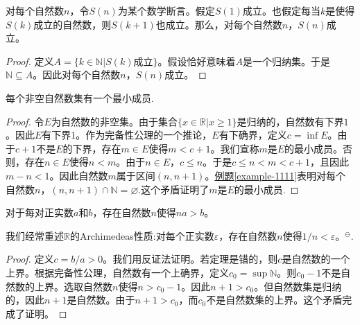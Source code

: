 \documentclass[lang=cn,newtx,10pt,scheme=chinese]{../Template/elegantbook}
\begin{document}
\begin{theorem}[数学归纳法原理]\label{theorem:数学归纳法原理}
  对每个自然数\(n\)，令\(S(n)\)为某个数学断言。假定\(S(1)\)成立。也假定每当\(k\)是使得\(S(k)\)成立的自然数，则\(S(k + 1)\)也成立。那么，对每个自然数\(n\)，\(S(n)\)成立。
\end{theorem}
\begin{proof}
  定义\(A = \{k\in\mathbb{N}|S(k)\)成立\(\}\)。假设恰好意味着\(A\)是一个归纳集。于是\(\mathbb{N}\subseteq A\)。因此对每个自然数\(n\)，\(S(n)\)成立。

\end{proof}

\begin{theorem}\label{theorem:每个非空自然数集有一个最小成员.}
  每个非空自然数集有一个最小成员.
\end{theorem}
\begin{proof}
  令\(E\)为自然数的非空集。由于集合\(\{x\in\mathbb{R}|x\geqslant1\}\)是归纳的，自然数有下界\(1\)。因此\(E\)有下界\(1\)。作为完备性公理的一个推论，\(E\)有下确界，定义\(c=\inf E\)。由于\(c + 1\)不是\(E\)的下界，存在\(m\in E\)使得\(m < c + 1\)。我们宣称\(m\)是\(E\)的最小成员。否则，存在\(n\in E\)使得\(n < m\)。由于\(n\in E\)，\(c\leqslant n\)。于是\(c\leqslant n < m < c + 1\)，且因此\(m - n < 1\)。因此自然数\(m\)属于区间\((n, n + 1)\)。\hyperref[example-1111]{例题\ref{example-1111}}表明对每个自然数\(n\)，\((n, n + 1)\cap\mathbb{N}=\varnothing\).这个矛盾证明了\(m\)是\(E\)的最小成员.

\end{proof}

\begin{theorem}[实数的Archimedeas性质]\label{theorem:实数的Archimedeas性质}
  对于每对正实数\(a\)和\(b\)，存在自然数\(n\)使得\(na > b\)。
\end{theorem}
\begin{note}
  我们经常重述\(\mathbb{R}\)的Archimedeas性质:对每个正实数\(\varepsilon\)，存在自然数\(n\)使得\(1/n<\varepsilon\)。$^{\ominus}$.
\end{note}
\begin{proof}
  定义\(c = b/a>0\)。我们用反证法证明。若定理是错的，则\(c\)是自然数的一个上界。根据完备性公理，自然数有一个上确界，定义\(c_0=\sup\mathbb{N}\)。则\(c_0 - 1\)不是自然数的上界。选取自然数\(n\)使得\(n>c_0 - 1\)。因此\(n + 1>c_0\)。但自然数集是归纳的，因此\(n + 1\)是自然数。由于\(n + 1>c_0\)，而\(c_0\)不是自然数集的上界。这个矛盾完成了证明。

\end{proof}
\end{document}
